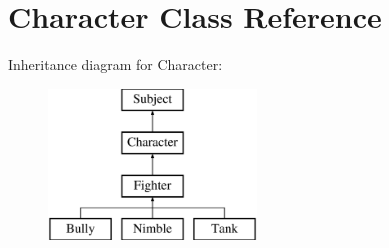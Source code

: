 \hypertarget{class_character}{}\section{Character Class Reference}
\label{class_character}
Inheritance diagram for Character\+:\begin{figure}[H]
\begin{center}
\leavevmode
\includegraphics[height=4.000000cm]{class_character}
\end{center}
\end{figure}
